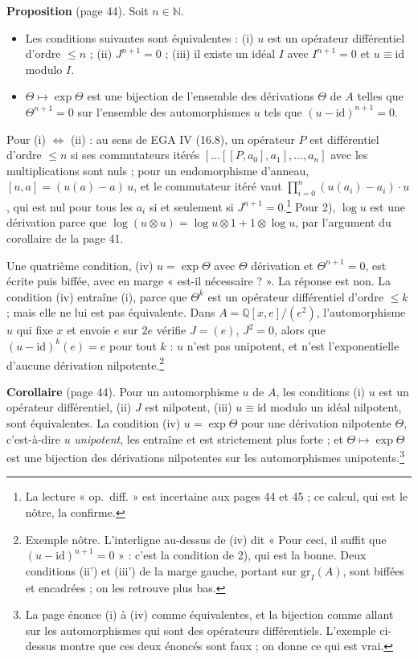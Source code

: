 \documentclass[11pt,a4paper]{article}
\begin{document}
\textbf{Proposition} (page 44). Soit $n \in \mathbb{N}$.
\begin{itemize}
  \item[1)] Les conditions suivantes sont équivalentes : (i) $u$ est un
  opérateur différentiel d'ordre $\leqslant n$ ; (ii) $J^{n+1} = 0$ ; (iii)
  il existe un idéal $I$ avec $I^{n+1} = 0$ et $u \equiv \mathrm{id}$ modulo
  $I$.
  \item[2)] $\Theta \mapsto \exp \Theta$ est une bijection de l'ensemble des
  dérivations $\Theta$ de $A$ telles que $\Theta^{n+1} = 0$ sur l'ensemble des
  automorphismes $u$ tels que $(u - \mathrm{id})^{n+1} = 0$.
\end{itemize}
Pour (i) $\Leftrightarrow$ (ii) : au sens de EGA IV (16.8), un opérateur $P$
est différentiel d'ordre $\leqslant n$ si ses commutateurs itérés
$[\ldots[[P, a_0], a_1], \ldots, a_n]$ avec les multiplications sont nuls ;
pour un endomorphisme d'anneau, $[u, a] = (u(a) - a)\, u$, et le commutateur
itéré vaut $\prod_{i=0}^n (u(a_i) - a_i) \cdot u$, qui est nul pour tous les
$a_i$ si et seulement si $J^{n+1} = 0$.\footnote{La lecture « op.\ diff. »
est incertaine aux pages 44 et 45 ; ce calcul, qui est le nôtre, la
confirme.} Pour 2), $\log u$ est une dérivation parce que
$\log(u \otimes u) = \log u \otimes 1 + 1 \otimes \log u$, par l'argument du
corollaire de la page 41.

Une quatrième condition, (iv) $u = \exp \Theta$ avec $\Theta$ dérivation et
$\Theta^{n+1} = 0$, est écrite puis biffée, avec en marge « est-il
nécessaire ? ». La réponse est non. La condition (iv) entraîne (i), parce que
$\Theta^k$ est un opérateur différentiel d'ordre $\leqslant k$ ; mais elle ne
lui est pas équivalente. Dans $A = \mathbb{Q}[x, e]/(e^2)$, l'automorphisme
$u$ qui fixe $x$ et envoie $e$ sur $2e$ vérifie $J = (e)$, $J^2 = 0$, alors
que $(u - \mathrm{id})^k(e) = e$ pour tout $k$ : $u$ n'est pas unipotent, et
n'est l'exponentielle d'aucune dérivation nilpotente.\footnote{Exemple nôtre.
L'interligne au-dessus de (iv) dit « Pour ceci, il suffit que
$(u - \mathrm{id})^{n+1} = 0$ » : c'est la condition de 2), qui est la bonne.
Deux conditions (ii') et (iii') de la marge gauche, portant sur
$\mathrm{gr}_I(A)$, sont biffées et encadrées ; on les retrouve plus bas.}

\textbf{Corollaire} (page 44). Pour un automorphisme $u$ de $A$, les
conditions (i) $u$ est un opérateur différentiel, (ii) $J$ est nilpotent,
(iii) $u \equiv \mathrm{id}$ modulo un idéal nilpotent, sont équivalentes.
La condition (iv) $u = \exp \Theta$ pour une dérivation nilpotente $\Theta$,
c'est-à-dire $u$ \emph{unipotent}, les entraîne et est strictement plus
forte ; et $\Theta \mapsto \exp \Theta$ est une bijection des dérivations
nilpotentes sur les automorphismes unipotents.\footnote{La page énonce
(i) à (iv) comme équivalentes, et la bijection comme allant sur les
automorphismes qui sont des opérateurs différentiels. L'exemple ci-dessus
montre que ces deux énoncés sont faux ; on donne ce qui est vrai.}
\end{document}
